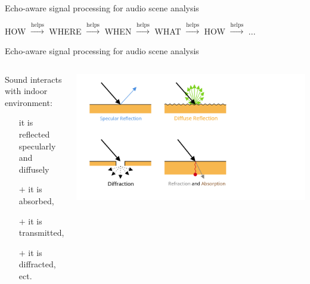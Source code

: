 \begin{frame}[t]{Echo-aware \alert{signal processing} for audio scene analysis}
    \pause
    \begin{center}
        HOW  $\overset{\text{helps}}{\longrightarrow}$ WHERE
            $\overset{\text{helps}}{\longrightarrow}$ WHEN
            $\overset{\text{helps}}{\longrightarrow}$ WHAT
            $\overset{\text{helps}}{\longrightarrow}$ HOW
            $\overset{\text{helps}}{\longrightarrow}$ ...
    \end{center}

\end{frame}


\begin{frame}[t]{\alert{Echo-aware} signal processing for audio scene analysis}

    \begin{columns}[onlytextwidth]
        \begin{block}{Sound interacts with indoor environment:}
            \small
            \begin{itemize}
                \item[] it is reflected
                \\\hspace{1em} specularly and diffusely\hspace{1em}
                \item[$+$] it is absorbed,
                \item[$+$] it is transmitted,
                \item[$+$] it is diffracted, ect.
            \end{itemize}
        \end{block}

        \includegraphics[trim={0 0 50 0},clip,width=\textwidth]{figures/sound_refletion.png}
    \end{columns}


\end{frame}
